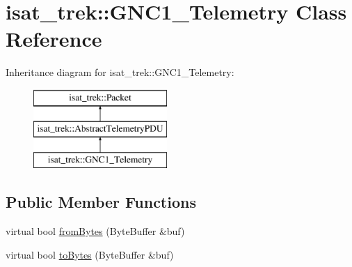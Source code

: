 \hypertarget{classisat__trek_1_1_g_n_c1___telemetry}{}\section{isat\+\_\+trek\+:\+:G\+N\+C1\+\_\+\+Telemetry Class Reference}
\label{classisat__trek_1_1_g_n_c1___telemetry}
Inheritance diagram for isat\+\_\+trek\+:\+:G\+N\+C1\+\_\+\+Telemetry\+:\begin{figure}[H]
\begin{center}
\leavevmode
\includegraphics[height=3.000000cm]{classisat__trek_1_1_g_n_c1___telemetry}
\end{center}
\end{figure}
\subsection*{Public Member Functions}
\begin{DoxyCompactItemize}
\item 
virtual bool \hyperlink{classisat__trek_1_1_g_n_c1___telemetry_abe69f50e0b2590c99d157e1f1dcec1d8}{from\+Bytes} (Byte\+Buffer \&buf)
\item 
virtual bool \hyperlink{classisat__trek_1_1_g_n_c1___telemetry_a9b35c147802a663cfe053813986191ae}{to\+Bytes} (Byte\+Buffer \&buf)
\end{DoxyCompactItemize}
